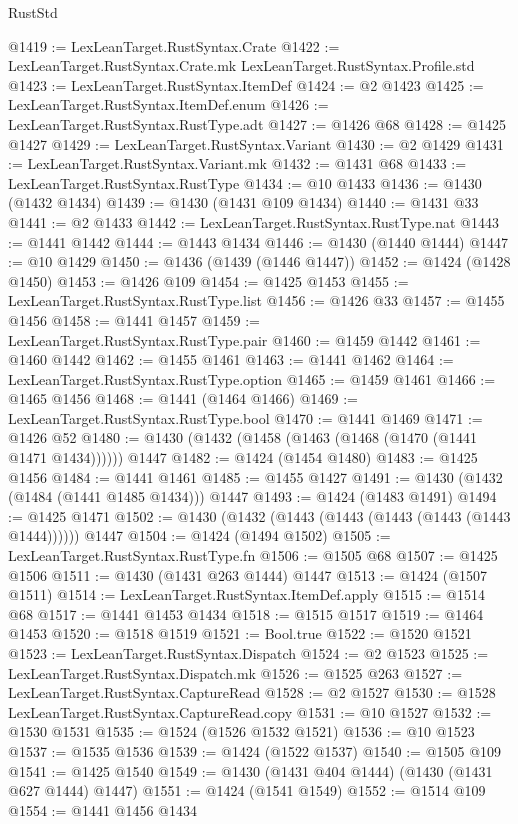 \begin{lexlean}{RustStd}
\begin{coremodule}
@1419 := LexLeanTarget.RustSyntax.Crate
@1422 := LexLeanTarget.RustSyntax.Crate.mk LexLeanTarget.RustSyntax.Profile.std
@1423 := LexLeanTarget.RustSyntax.ItemDef
@1424 := @2 @1423
@1425 := LexLeanTarget.RustSyntax.ItemDef.enum
@1426 := LexLeanTarget.RustSyntax.RustType.adt
@1427 := @1426 @68
@1428 := @1425 @1427
@1429 := LexLeanTarget.RustSyntax.Variant
@1430 := @2 @1429
@1431 := LexLeanTarget.RustSyntax.Variant.mk
@1432 := @1431 @68
@1433 := LexLeanTarget.RustSyntax.RustType
@1434 := @10 @1433
@1436 := @1430 (@1432 @1434)
@1439 := @1430 (@1431 @109 @1434)
@1440 := @1431 @33
@1441 := @2 @1433
@1442 := LexLeanTarget.RustSyntax.RustType.nat
@1443 := @1441 @1442
@1444 := @1443 @1434
@1446 := @1430 (@1440 @1444)
@1447 := @10 @1429
@1450 := @1436 (@1439 (@1446 @1447))
@1452 := @1424 (@1428 @1450)
@1453 := @1426 @109
@1454 := @1425 @1453
@1455 := LexLeanTarget.RustSyntax.RustType.list
@1456 := @1426 @33
@1457 := @1455 @1456
@1458 := @1441 @1457
@1459 := LexLeanTarget.RustSyntax.RustType.pair
@1460 := @1459 @1442
@1461 := @1460 @1442
@1462 := @1455 @1461
@1463 := @1441 @1462
@1464 := LexLeanTarget.RustSyntax.RustType.option
@1465 := @1459 @1461
@1466 := @1465 @1456
@1468 := @1441 (@1464 @1466)
@1469 := LexLeanTarget.RustSyntax.RustType.bool
@1470 := @1441 @1469
@1471 := @1426 @52
@1480 := @1430 (@1432 (@1458 (@1463 (@1468 (@1470 (@1441 @1471 @1434)))))) @1447
@1482 := @1424 (@1454 @1480)
@1483 := @1425 @1456
@1484 := @1441 @1461
@1485 := @1455 @1427
@1491 := @1430 (@1432 (@1484 (@1441 @1485 @1434))) @1447
@1493 := @1424 (@1483 @1491)
@1494 := @1425 @1471
@1502 := @1430 (@1432 (@1443 (@1443 (@1443 (@1443 (@1443 @1444)))))) @1447
@1504 := @1424 (@1494 @1502)
@1505 := LexLeanTarget.RustSyntax.RustType.fn
@1506 := @1505 @68
@1507 := @1425 @1506
@1511 := @1430 (@1431 @263 @1444) @1447
@1513 := @1424 (@1507 @1511)
@1514 := LexLeanTarget.RustSyntax.ItemDef.apply
@1515 := @1514 @68
@1517 := @1441 @1453 @1434
@1518 := @1515 @1517
@1519 := @1464 @1453
@1520 := @1518 @1519
@1521 := Bool.true
@1522 := @1520 @1521
@1523 := LexLeanTarget.RustSyntax.Dispatch
@1524 := @2 @1523
@1525 := LexLeanTarget.RustSyntax.Dispatch.mk
@1526 := @1525 @263
@1527 := LexLeanTarget.RustSyntax.CaptureRead
@1528 := @2 @1527
@1530 := @1528 LexLeanTarget.RustSyntax.CaptureRead.copy
@1531 := @10 @1527
@1532 := @1530 @1531
@1535 := @1524 (@1526 @1532 @1521)
@1536 := @10 @1523
@1537 := @1535 @1536
@1539 := @1424 (@1522 @1537)
@1540 := @1505 @109
@1541 := @1425 @1540
@1549 := @1430 (@1431 @404 @1444) (@1430 (@1431 @627 @1444) @1447)
@1551 := @1424 (@1541 @1549)
@1552 := @1514 @109
@1554 := @1441 @1456 @1434

\end{coremodule}
\end{lexlean}

